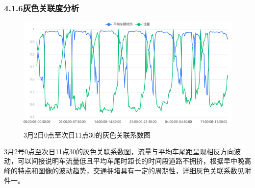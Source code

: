 \documentclass[UTF8]{article}
\begin{document}
         \subsubsection{4.1.6灰色关联度分析}
         \begin{figure}[H]
             \includegraphics[width=\linewidth]{11.png}
             \caption{3月2日0点至次日11点30的灰色关联系数图}
         \end{figure}
         3月2号0点至次日11点30的灰色关联系数图，流量与平均车尾距呈现相反方向波动，可以间接说明车流量低且平均车尾时距长的时间段道路不拥挤，根据早中晚高峰的特点和图像的波动趋势，交通拥堵具有一定的周期性，详细灰色关联系数见附件一。\\
         \begin{table}[H]
             \centering
         \end{table}
\end{document}
